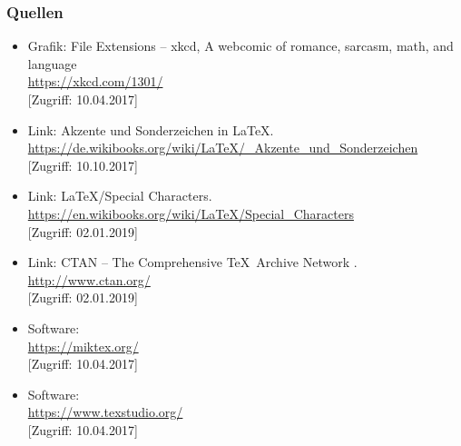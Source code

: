 \documentclass[a4paper,10pt, bibtotoc]{beamer}
\begin{document}
\begin{frame}[allowframebreaks]
\frametitle{Quellen}

{\footnotesize
	
	\begin{itemize}
		
		\item Grafik: File Extensions -- xkcd, A webcomic of romance, sarcasm, math, and language\\
		\url{https://xkcd.com/1301/} \\
		{[}Zugriff: 10.04.2017]
		
		\item Link: Akzente und Sonderzeichen in \LaTeX .\\
		\url{https://de.wikibooks.org/wiki/LaTeX/_Akzente_und_Sonderzeichen}\\
		{[}Zugriff: 10.10.2017]

		\item Link: \LaTeX /Special Characters.\\
		\url{https://en.wikibooks.org/wiki/LaTeX/Special_Characters}\\
		{[}Zugriff: 02.01.2019]
		
		\item Link: CTAN -- The Comprehensive \TeX\ Archive Network .\\
		\url{http://www.ctan.org/}\\
		{[}Zugriff: 02.01.2019]

		\item Software: \\
		\url{https://miktex.org/} \\
		{[}Zugriff: 10.04.2017]
		
		\item Software: \\
		\url{https://www.texstudio.org/} \\
		{[}Zugriff: 10.04.2017]
		

\end{itemize}}
\end{frame}
\end{document}
